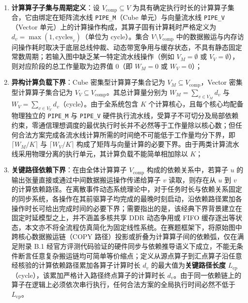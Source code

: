 \documentclass[anonymous,withtoc]{gmcm2026}
\providecommand{\tightlist}{\setlength{\itemsep}{0pt}\setlength{\parskip}{0pt}}
\begin{document}
\begin{enumerate}
\def\labelenumi{\arabic{enumi}.}
\tightlist
\item
  \textbf{计算算子子集与周期定义}：设 \(V_{\mathrm{comp}} \subseteq V\) 为具有确定执行时长的计算算子集合，它由绑定在矩阵流水线 \texttt{PIPE\_M}（Cube 单元）与向量流水线 \texttt{PIPE\_V}（Vector 单元）上的计算操作构成，其算子固有计算耗时严格定义为 \(d_v = \max(1, \text{cycles}_v)\)（单位为 cycle）。集合 \(V \setminus V_{\mathrm{comp}}\) 中的数据搬运与内存访问操作耗时取决于底层总线仲裁、动态带宽争用与缓存状态，不具有静态固定常数周期；若输入图中缺乏某一特定流水线操作（例如 \(V_M = \emptyset\) 或 \(V_V = \emptyset\)），则对应阶段的总工作量取为边界值 0（即 \(W_M = 0\) 或 \(W_V = 0\)）；
\item
  \textbf{异构计算负载下界}：Cube 密集型计算算子集合记为 \(V_M \subseteq V_{\mathrm{comp}}\)，Vector 密集型计算算子集合记为 \(V_V \subseteq V_{\mathrm{comp}}\)。其总计算量分别为 \(W_M = \sum_{v \in V_M} d_v\) 与 \(W_V = \sum_{v \in V_V} d_v\)（cycle）。由于全系统包含 \(K\) 个计算核心，且每个核心均配备物理独立的 \texttt{PIPE\_M} 与 \texttt{PIPE\_V} 硬件执行流水线，受算子不可切分及局部依赖约束，零通信理想调度的最优执行时长并不必然等于工作量除以核心数；但任何合法方案完成各流水线计算所需的时间绝不可能低于工作量均分下界，即 \(\lceil W_M / K \rceil\) 与 \(\lceil W_V / K \rceil\) 构成了矩阵与向量计算的必要下界。由于两类计算流水线采用物理分离的执行单元，其计算负载不能简单相加除以 \(K\)；
\item
  \textbf{关键路径依赖下界}：在由全体计算算子 \(V_{\mathrm{comp}}\) 构成的依赖关系中，若算子 \(u\) 的输出张量直接或通过中间数据搬运操作传递给算子 \(v\) 读取，则存在从 \(u\) 到 \(v\) 的计算依赖路径。在离散事件动态系统理论中，对于任务时长与依赖关系固定的同步系统，各操作在其前驱算子均完成的最晚时刻启动，沿依赖路径累加各操作时长可给出完成时间的必要下界\cite[第11--13、109--110页]{ref20}；需要指出的是，该经典下界背景建立在固定时延模型之上，并不涵盖多核共享 DDR 动态争用或 FIFO 缓存逐出等状态，本文亦不将全流程仿真简化为固定线性系统。在赛题框架下，将原始图中跨核心数据搬运链（COPY 路径）投影或折叠为计算算子间的依赖弧，仅在满足附录 B.1 经官方评测代码验证的硬件同步与依赖推导语义下成立，不能无条件断言任意复杂搬运链均可简单等价缩点；定义从源点算子到汇点算子沿任意经核验的计算依赖路径累加各算子计算时长 \(d_v\) 的最大值为\textbf{关键路径长度} \(L_{\mathrm{cp}}\)（cycle），该累加严格计入路径终点算子的计算时长 \(d_v\)。由于同一依赖链上的算子在逻辑上必须依次串行执行，任何合法方案的全局执行时间必然不低于 \(L_{\mathrm{cp}}\)。
\end{enumerate}
\end{document}
